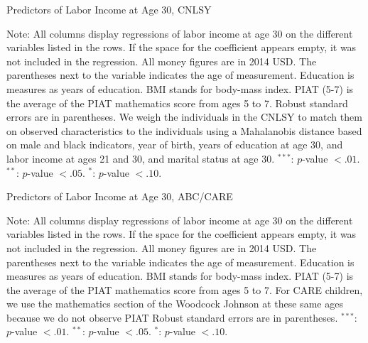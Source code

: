 \begin{table}[H] 
\begin{threeparttable}
\caption{Predictors of Labor Income at Age 30, CNLSY}
\label{table:predcnlsy}
\centering 

\begin{tablenotes}
\footnotesize
\item Note: All columns display regressions of labor income at age 30 on the different variables listed in the rows. If the space for the coefficient appears empty, it was not included in the regression. All money figures are in 2014 USD. The parentheses next to the variable indicates the age of measurement. Education is measures as years of education. BMI stands for body-mass index. PIAT (5-7) is the average of the PIAT mathematics score from ages 5 to 7. Robust standard errors are in parentheses. We weigh the individuals in the CNLSY to match them on observed characteristics to the individuals using a Mahalanobis distance based on male and black indicators, year of birth, years of education at age 30, and labor income at ages 21 and 30, and marital status at age 30. $^{***}$: $p$-value $< .01$. $^{**}$: $p$-value $< .05$. $^{*}$: $p$-value $< .10$.
\end{tablenotes}
\end{threeparttable}
\end{table}

\begin{table}[H] 
\begin{threeparttable}
\caption{Predictors of Labor Income at Age 30, ABC/CARE}
\label{table:predabc}
\centering 

\begin{tablenotes}
\footnotesize
\item Note: All columns display regressions of labor income at age 30 on the different variables listed in the rows. If the space for the coefficient appears empty, it was not included in the regression. All money figures are in 2014 USD. The parentheses next to the variable indicates the age of measurement. Education is measures as years of education. BMI stands for body-mass index. PIAT (5-7) is the average of the PIAT mathematics score from ages 5 to 7. For CARE children, we use the mathematics section of the Woodcock Johnson at these same ages because we do not observe PIAT Robust standard errors are in parentheses. $^{***}$: $p$-value $< .01$. $^{**}$: $p$-value $< .05$. $^{*}$: $p$-value $< .10$.
\end{tablenotes}
\end{threeparttable}
\end{table}

